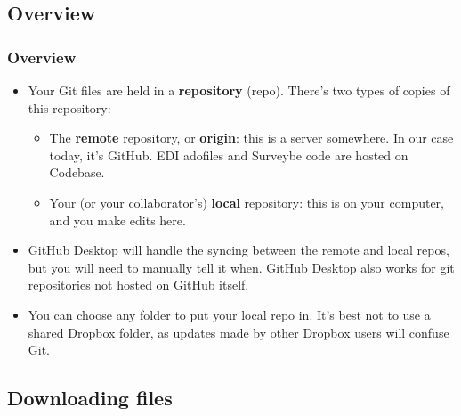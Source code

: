 \documentclass{beamer}
\begin{document}
\subsection{Overview}
\begin{frame}
\frametitle{Overview}
	\begin{itemize}
		\item Your Git files are held in a \textbf{repository} (repo). There's two types of copies of this repository:
		\begin{itemize}
			\item The \textbf{remote} repository, or \textbf{origin}: this is a server somewhere. In our case today, it's GitHub. EDI adofiles and Surveybe code are hosted on Codebase.
			\item Your (or your collaborator's) \textbf{local} repository: this is on your computer, and you make edits here.
		\end{itemize}
		\item GitHub Desktop will handle the syncing between the remote and local repos, but you will need to manually tell it when. GitHub Desktop also works for git repositories not hosted on GitHub itself.
		\item You can choose any folder to put your local repo in. It's best not to use a shared 
				Dropbox folder, as updates made by other Dropbox users will confuse Git.	
	\end{itemize}
\end{frame}

\subsection{Downloading files}
\end{document}
